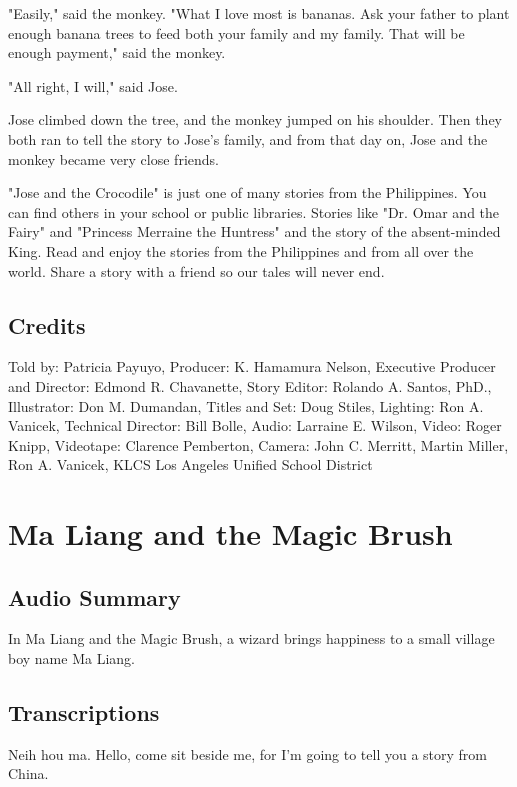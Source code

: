 "Easily," said the monkey. "What I love most is bananas. Ask your father to plant enough banana trees to feed both your family and my family. That will be enough payment," said the monkey.

"All right, I will," said Jose.

Jose climbed down the tree, and the monkey jumped on his shoulder. Then they both ran to tell the story to Jose's family, and from that day on, Jose and the monkey became very close friends.

"Jose and the Crocodile" is just one of many stories from the Philippines. You can find others in your school or public libraries. Stories like "Dr. Omar and the Fairy" and "Princess Merraine the Huntress" and the story of the absent-minded King. Read and enjoy the stories from the Philippines and from all over the world. Share a story with a friend so our tales will never end.

\subsection{Credits}

Told by: Patricia Payuyo,
Producer: K. Hamamura Nelson,
Executive Producer and Director: Edmond R. Chavanette,
Story Editor: Rolando A. Santos, PhD.,
Illustrator: Don M. Dumandan,
Titles and Set: Doug Stiles,
Lighting: Ron A. Vanicek,
Technical Director: Bill Bolle,
Audio: Larraine E. Wilson,
Video: Roger Knipp,
Videotape: Clarence Pemberton,
Camera: John C. Merritt, Martin Miller, Ron A. Vanicek,
KLCS Los Angeles Unified School District

\section{Ma Liang and the Magic Brush}

\subsection{Audio Summary}

In Ma Liang and the Magic Brush, a wizard brings happiness to a small village boy name Ma Liang.

\subsection{Transcriptions}

Neih hou ma. Hello, come sit beside me, for I'm going to tell you a story from China.

